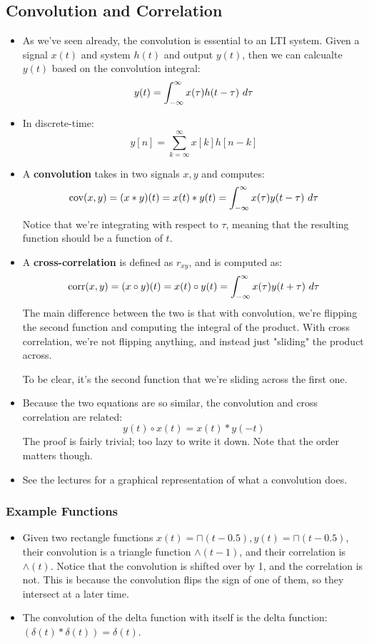 \subsection{Convolution and Correlation}
\begin{itemize}
	\item As we've seen already, the convolution is essential to an LTI system. Given a signal \( x(t) \)
		and system \( h(t) \) and output \( y(t) \), then we can calcualte \( y(t)  \) based on the convolution
		integral:
		\[
		y(t) = \int_{-\infty}^{\infty} x(\tau) h(t - \tau) \ d  \tau 
		\] 
	\item In discrete-time:
		\[
			y[n] = \sum_{k = \infty}^{\infty}x[k] h[n -k]
		\] 
	\item A \textbf{convolution} takes in two signals \( x, y \) and computes:
		\[
			\mathrm{cov}(x, y)= (x * y)(t) = x(t) * y(t) = \int_{-\infty}^{\infty} x(\tau) y(t - \tau) \ d \tau 
		\] 
		Notice that we're integrating with respect to \( \tau \), meaning that the resulting function should be 
		a function of \( t \). 
	\item A \textbf{cross-correlation} is defined as \( r_{xy} \), and is computed as:
		\[
			\mathrm{corr}(x, y) = (x \circ y)(t) = x(t) \circ y(t) = \int_{-\infty}^{\infty} x(\tau) 
			y(t + \tau) \ d \tau
		\] 
		The main difference between the two is that with convolution, we're flipping the second function and 
		computing the integral of the product. With cross correlation, we're not flipping anything, and instead 
		just "sliding" the product across.

		To be clear, it's the second function that we're sliding across the first one.
	\item Because the two equations are so similar, the convolution and cross correlation are related: 
		\[
			y(t) \circ x(t) = x(t) * y(-t)
		\] 
		The proof is fairly trivial; too lazy to write it down. Note that the order matters though.
	\item See the lectures for a graphical representation of what a convolution does. 
\end{itemize}
\subsubsection{Example Functions} 
\begin{itemize}
	\item Given two rectangle functions \( x(t) = \sqcap(t - 0.5), y(t) = \sqcap(t - 0.5) \), their convolution 
		is a triangle function \( \wedge(t - 1) \), and their correlation is \( \wedge(t) \). Notice that 
		the convolution is shifted over by 1, and the correlation is not. This is because the convolution 
		flips the sign of one of them, so they intersect at a later time.
	\item The convolution of the delta function with itself is the delta function: \( (\delta(t) * \delta(t)) 
		= \delta(t) \).
\end{itemize}
